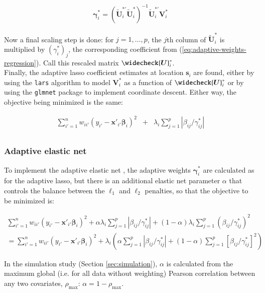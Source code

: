 \documentclass[authoryear, review, 11pt]{elsarticle}
\begin{document}
	\begin{eqnarray}\label{eq:adaptive-weights-regression}
		\bm{\gamma}_i^* = \left( \widetilde{\bm{U}}_i^{*'} \widetilde{\bm{U}}_i^* \right)^{-1} \widetilde{\bm{U}}_i^{*'} \bm{V}_i^*
	\end{eqnarray}
	
	Now a final scaling step is done: for $j=1, \dots, p$, the $j$th column of $\tilde{\bm{U}}_i^*$ is multiplied by $\left(\gamma_i^*\right)_j$, the corresponding coefficient from (\ref{eq:adaptive-weights-regression}). Call this rescaled matrix $\widecheck{\bm{U}}_i^*$.\\
	
	Finally, the adaptive lasso coefficient estimates at location $\bm{s}_i$ are found, either by using the \verb!lars! algorithm \citep{Efron:2004b} to model $\bm{V}_i^*$ as a function of $\widecheck{\bm{U}}_i^*$ or by using the \verb!glmnet! package to implement coordinate descent.	Either way, the objective being minimized is the same:
	
	\begin{eqnarray}
		\sum_{i'=1}^n w_{ii'} \left(y_{i'} - \bm{x}'_{i'} \bm{\beta}_i \right)^2 &+&  \lambda_i \sum_{j=1}^p |\beta_{ij} / \gamma_{ij}^*|\\
	\end{eqnarray}

	\subsubsection{Adaptive elastic net}
	To implement the adaptive elastic net \citep{Zou:2009}, the adaptive weights $\bm{\gamma}_i^*$ are calculated as for the adaptive lasso, but there is an additional elastic net parameter $\alpha$ that controls the balance between the $\ell_1$ and $\ell_2$ penalties, so that the objective to be minimized is:

	\begin{eqnarray}
		\sum_{i'=1}^n w_{ii'} \left(y_{i'} - \bm{x}'_{i'} \bm{\beta}_i \right)^2 + \alpha \lambda_i \sum_{j=1}^p |\beta_{ij} / \gamma_{ij}^*| + (1-\alpha) \lambda_i \sum_{j=1}^p  \left( \beta_{ij} / \gamma_{ij}^* \right)^2\\
		= \sum_{i'=1}^n w_{ii'} \left(y_{i'} - \bm{x}'_{i'} \bm{\beta}_i \right)^2 + \lambda_i \left(\alpha  \sum_{j=1}^p |\beta_{ij} / \gamma_{ij}^*| + (1-\alpha) \sum_{j=1}^p  \left[ \beta_{ij} / \gamma_{ij}^* \right]^2 \right)
	\end{eqnarray}
	
	In the simulation study (Section \ref{sec:simulation}), $\alpha$ is calculated from the maximum global (i.e. for all data without weighting) Pearson correlation between any two covariates, $\rho_{\text{max}}$: $\alpha = 1-\rho_{\text{max}}$.
\end{document}
